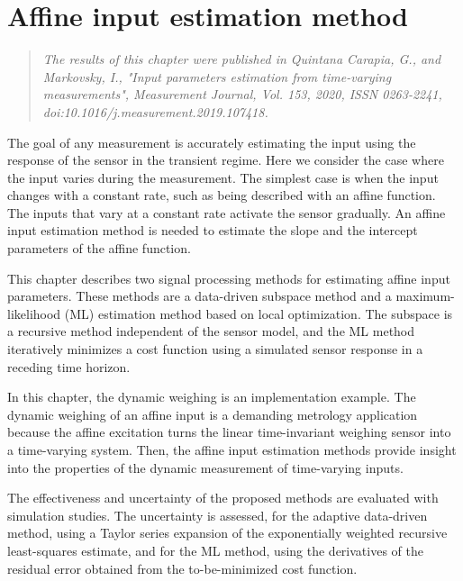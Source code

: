 \glsresetall

\chapter{Affine input estimation method}\label{chap:AffineInput}


\begin{quote}
\vspace{-0.5cm}
\emph{The results of this chapter were published in Quintana Carapia, G., and Markovsky, I.,
"Input parameters estimation from time-varying measurements", Measurement Journal, Vol. 153, 2020,
ISSN 0263-2241, doi:10.1016/j.measurement.2019.107418. \nocite{QuintanaMEAS} }\vfill{}
\end{quote}



The goal of any measurement is accurately estimating the input using the response of the sensor in the transient regime.
Here we consider the case where the input varies during the measurement.
The simplest case is when the input changes with a constant rate, such as being described with an affine function.
The inputs that vary at a constant rate activate the sensor gradually. 
An affine input estimation method is needed to estimate the slope and the intercept parameters of the affine function.

This chapter describes two signal processing methods for estimating affine input parameters.
These methods are a data-driven subspace method and a maximum-likelihood (ML) estimation method based on local optimization.
The subspace is a recursive method independent of the sensor model, and the ML method iteratively minimizes a cost function using a simulated sensor response in a receding time horizon.

In this chapter, the dynamic weighing is an implementation example.
The dynamic weighing of an affine input is a demanding metrology application because the affine excitation turns the linear time-invariant weighing sensor into a time-varying system.
Then, the affine input estimation methods provide insight into the properties of the dynamic measurement of time-varying inputs.

The effectiveness and uncertainty of the proposed methods are evaluated with simulation studies.
The uncertainty is assessed, for the adaptive data-driven method, using a Taylor series expansion of the exponentially weighted recursive least-squares estimate, and
for the ML method, using the derivatives of the residual error obtained from the to-be-minimized cost function.

